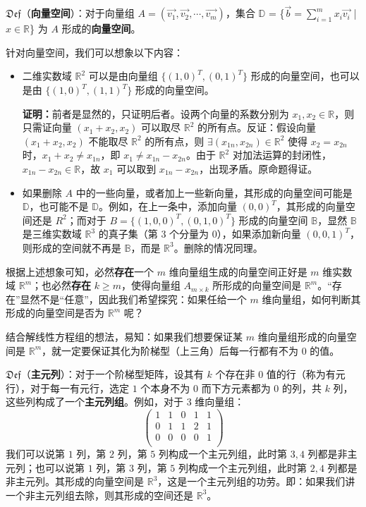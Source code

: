 \documentclass[b5paper]{ctexart}
\newcommand{\R}{\mathbb{R}}
\newcommand \ding[2]{$\mathfrak{Def}$（\textbf{#1}）：#2}
\begin{document}
	\vspace{12pt}
	
	\ding{向量空间}{对于向量组 $A = (\vec{v_1}, \vec{ v_2}, \cdots, \vec{v_m})$，集合 $\mathbb{D}$ = \{$\vec{b} = \sum \limits_{i = 1}^m x_i \vec{v_i}$ | $x \in \mathbb{R}$\} 为 $A$ 形成的\textbf{向量空间}。}
	
	\vspace{12pt}
	
	针对向量空间，我们可以想象以下内容：
	
	\begin{itemize}
		\item 二维实数域 $\R^2$ 可以是由向量组 $\{(1, 0)^T, (0,1)^T\}$ 形成的向量空间，也可以是由 $\{(1, 0)^T, (1,1)^T\}$ 形成的向量空间。
		
		\textbf{证明：}前者是显然的，只证明后者。设两个向量的系数分别为 $x_1, x_2 \in \R$，则只需证向量 $(x_1 + x_2, x_2)$ 可以取尽 $\R^2$ 的所有点。反证：假设向量 $(x_1 + x_2, x_2)$ 不能取尽 $\R^2$ 的所有点，则 $\exists (x_{1n}, x_{2n}) \in \R^2$ 使得 $x_2 = x_{2n}$ 时，$x_1 + x_2 \ne x_{1n}$，即 $x_1 \ne x_{1n} - x_{2n}$。由于 $\R^2$ 对加法运算的封闭性，$x_{1n} - x_{2n} \in \R$，故 $x_1$ 可以取到 $x_{1n} - x_{2n}$，出现矛盾。原命题得证。
		
		\item 如果删除 $A$ 中的一些向量，或者加上一些新向量，其形成的向量空间可能是 $\mathbb{D}$，也可能不是 $\mathbb{D}$。例如，在上一条中，添加向量 $(0, 0)^T$，其形成的向量空间还是 $R^2$；而对于 $B = \{(1, 0, 0)^T, (0, 1, 0)^T\}$ 形成的向量空间 $\mathbb{B}$，显然 $\mathbb{B}$ 是三维实数域 $\R^3$ 的真子集（第 $3$ 个分量为 $0$），如果添加新向量 $(0, 0, 1)^T$，则形成的空间就不再是 $\mathbb{B}$，而是 $\R^3$。删除的情况同理。
	\end{itemize}
	
	根据上述想象可知，必然\textbf{存在}一个 $m$ 维向量组生成的向量空间正好是 $m$ 维实数域 $\R^m$；也必然\textbf{存在} $k \ge m$，使得向量组 $A_{m \times k}$ 所形成的向量空间是 $\R^m$。“存在”显然不是“任意”，因此我们希望探究：如果任给一个 $m$ 维向量组，如何判断其形成的向量空间是否为 $\R^m$ 呢？
	
	结合解线性方程组的想法，易知：如果我们想要保证某 $m$ 维向量组形成的向量空间是 $\R^m$，就一定要保证其化为阶梯型（上三角）后每一行都有不为 $0$ 的值。
	
	\vspace{12pt}
	
	\ding{主元列}{对于一个阶梯型矩阵，设其有 $k$ 个存在非 $0$ 值的行（称为有元行），对于每一有元行，选定 $1$ 个本身不为 $0$ 而下方元素都为 $0$ 的列，共 $k$ 列，这些列构成了一个\textbf{主元列组}。例如，对于 $3$ 维向量组：
	\[
	\begin{pmatrix}
		1 & 1 & 0 & 1 & 1 \\
		0 & 1 & 1 & 2 & 1 \\
		0 & 0 & 0 & 0 & 1 \\
	\end{pmatrix}
	\]
	我们可以说第 $1$ 列，第 $2$ 列，第 $5$ 列构成一个主元列组，此时第 $3, 4$ 列都是非主元列；也可以说第 $1$ 列，第 $3$ 列，第 $5$ 列构成一个主元列组，此时第 $2, 4$ 列都是非主元列。其形成的向量空间是 $\R^3$，这是一个主元列组的功劳。即：如果我们讲一个非主元列组去除，则其形成的空间还是 $\R^3$。
	}
 	
\end{document}
